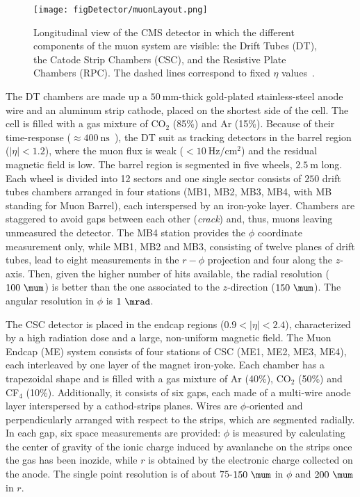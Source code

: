 \begin{figure}[hbt]
  \begin{center}
    \texttt{[image: figDetector/muonLayout.png]}
    \caption{Longitudinal view of the CMS detector in which the different components of the muon system are visible:
             the Drift Tubes (DT), the Catode Strip Chambers (CSC), and the Resistive Plate Chambers (RPC).
             The dashed lines correspond to fixed $\eta$ values~\cite{Chatrchyan:2013sba}.} 
    \label{fig:muLayout}
  \end{center}
\end{figure}

The DT chambers are made up a $50~\si{\mm}$-thick gold-plated stainless-steel anode wire and an aluminum strip cathode, 
placed on the shortest side of the cell. The cell is filled with a gas mixture of CO$_2$ (85\%) and Ar (15\%). 
Because of their time-response ($\approx400~\si{\ns}$~\cite{Chatrchyan:2013sba}), the DT suit as tracking detectors 
in the barrel region ($|\eta|<1.2$), where the muon flux is weak ($<10~\si{\hertz}/\si{\cm}^2$) and the residual magnetic field is low.  
The barrel region is segmented in five wheels, $2.5~\si{\m}$ long. Each wheel is divided into 12 sectors and 
one single sector consists of $250$ drift tubes chambers arranged in four stations (MB1, MB2, MB3, MB4, with MB standing for
Muon Barrel), each interspersed by an iron-yoke layer. Chambers are staggered to avoid gaps between each other (\emph{crack}) and, thus, muons leaving unmeasured 
the detector. The MB4 station provides the $\phi$ coordinate measurement only, while MB1, MB2 and MB3, consisting of twelve 
planes of drift tubes, lead to eight measurements in the $r-\phi$ projection and four along the $z$-axis.
Then, given the higher number of hits available, the radial resolution ($100~\si{\mum}$) is better than the one
associated to the $z$-direction ($150~\si{\mum}$). The angular resolution in $\phi$ is $1~\si{\mrad}$.

The CSC detector is placed in the endcap regions ($0.9<|\eta|<2.4$), characterized by a high radiation dose
and a large, non-uniform magnetic field. The Muon Endcap (ME) system consists of four stations of CSC (ME1, ME2, ME3, ME4), each
interleaved by one layer of the magnet iron-yoke. Each chamber has a trapezoidal shape and is filled with 
a gas mixture of Ar (40\%), CO$_2$ (50\%) and CF$_4$ (10\%). Additionally, it consists of six gaps, each
made of a multi-wire anode layer interspersed by a cathod-strips planes. Wires are $\phi$-oriented and 
perpendicularly arranged with respect to the strips, which are segmented radially. 
In each gap, six space measurements are provided: $\phi$ is measured by calculating the center of gravity 
of the ionic charge induced by avanlanche on the strips once the gas has been inozide, while 
$r$ is obtained by the electronic charge collected on the anode. The single point resolution 
is of about $75$-$150~\si{\mum}$ in $\phi$ and $200~\si{\mum}$ in $r$.

